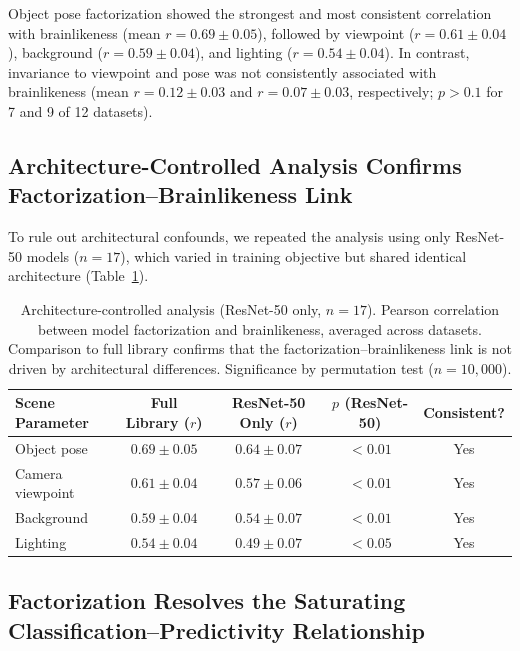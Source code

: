 \documentclass[11pt]{article}
\begin{document}
Object pose factorization showed the strongest and most consistent correlation with brainlikeness (mean $r = 0.69 \pm 0.05$), followed by viewpoint ($r = 0.61 \pm 0.04$), background ($r = 0.59 \pm 0.04$), and lighting ($r = 0.54 \pm 0.04$). In contrast, invariance to viewpoint and pose was not consistently associated with brainlikeness (mean $r = 0.12 \pm 0.03$ and $r = 0.07 \pm 0.03$, respectively; $p > 0.1$ for 7 and 9 of 12 datasets).

\subsection{Architecture-Controlled Analysis Confirms Factorization--Brainlikeness Link}

To rule out architectural confounds, we repeated the analysis using only ResNet-50 models ($n = 17$), which varied in training objective but shared identical architecture (Table~\ref{tab:resnet_control}).

\begin{table}[H]
\centering
\caption{Architecture-controlled analysis (ResNet-50 only, $n = 17$). Pearson correlation between model factorization and brainlikeness, averaged across datasets. Comparison to full library confirms that the factorization--brainlikeness link is not driven by architectural differences. Significance by permutation test ($n = 10{,}000$).}
\label{tab:resnet_control}
\begin{tabular}{lcccc}
\toprule
\textbf{Scene Parameter} & \textbf{Full Library ($r$)} & \textbf{ResNet-50 Only ($r$)} & \textbf{$p$ (ResNet-50)} & \textbf{Consistent?} \\
\midrule
Object pose & $0.69 \pm 0.05$ & $\mathbf{0.64 \pm 0.07}$ & $< 0.01$ & Yes \\
Camera viewpoint & $0.61 \pm 0.04$ & $0.57 \pm 0.06$ & $< 0.01$ & Yes \\
Background & $0.59 \pm 0.04$ & $0.54 \pm 0.07$ & $< 0.01$ & Yes \\
Lighting & $0.54 \pm 0.04$ & $0.49 \pm 0.07$ & $< 0.05$ & Yes \\
\bottomrule
\end{tabular}
\end{table}

\subsection{Factorization Resolves the Saturating Classification--Predictivity Relationship}
\end{document}
